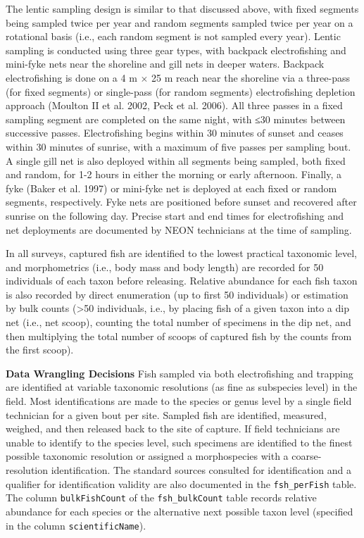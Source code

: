 \documentclass[
  12pt,
]{article}
\begin{document}
The lentic sampling design is similar to that discussed above, with fixed segments being sampled twice per year and random segments sampled twice per year on a rotational basis (i.e., each random segment is not sampled every year). Lentic sampling is conducted using three gear types, with backpack electrofishing and mini-fyke nets near the shoreline and gill nets in deeper waters. Backpack electrofishing is done on a 4 m \(\times\) 25 m reach near the shoreline via a three-pass (for fixed segments) or single-pass (for random segments) electrofishing depletion approach (Moulton II et al. 2002, Peck et al. 2006). All three passes in a fixed sampling segment are completed on the same night, with ≤30 minutes between successive passes. Electrofishing begins within 30 minutes of sunset and ceases within 30 minutes of sunrise, with a maximum of five passes per sampling bout. A single gill net is also deployed within all segments being sampled, both fixed and random, for 1-2 hours in either the morning or early afternoon. Finally, a fyke (Baker et al. 1997) or mini-fyke net is deployed at each fixed or random segments, respectively. Fyke nets are positioned before sunset and recovered after sunrise on the following day. Precise start and end times for electrofishing and net deployments are documented by NEON technicians at the time of sampling.

In all surveys, captured fish are identified to the lowest practical taxonomic level, and morphometrics (i.e., body mass and body length) are recorded for 50 individuals of each taxon before releasing. Relative abundance for each fish taxon is also recorded by direct enumeration (up to first 50 individuals) or estimation by bulk counts (\textgreater50 individuals, i.e., by placing fish of a given taxon into a dip net (i.e., net scoop), counting the total number of specimens in the dip net, and then multiplying the total number of scoops of captured fish by the counts from the first scoop).

\textbf{Data Wrangling Decisions} Fish sampled via both electrofishing and trapping are identified at variable taxonomic resolutions (as fine as subspecies level) in the field. Most identifications are made to the species or genus level by a single field technician for a given bout per site. Sampled fish are identified, measured, weighed, and then released back to the site of capture. If field technicians are unable to identify to the species level, such specimens are identified to the finest possible taxonomic resolution or assigned a morphospecies with a coarse-resolution identification. The standard sources consulted for identification and a qualifier for identification validity are also documented in the \texttt{fsh\_perFish} table. The column \texttt{bulkFishCount} of the \texttt{fsh\_bulkCount} table records relative abundance for each species or the alternative next possible taxon level (specified in the column \texttt{scientificName}).
\end{document}
